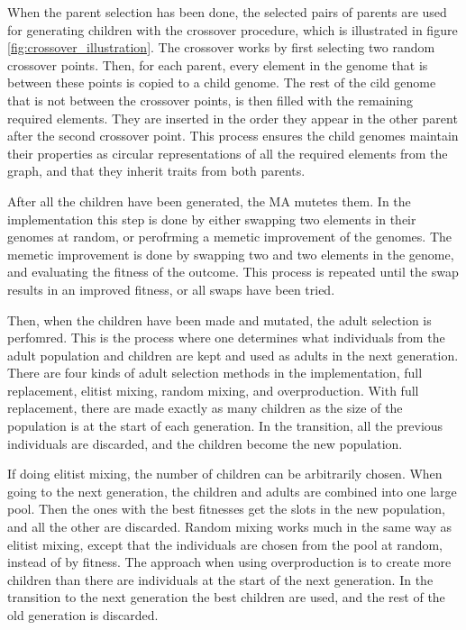 When the parent selection has been done, the selected pairs of parents are used for generating children with the crossover procedure, which is illustrated in figure \ref{fig:crossover_illustration}. The crossover works by first selecting two random crossover points. Then, for each parent, every element in the genome that is between these points is copied to a child genome. The rest of the cild genome that is not between the crossover points, is then filled with the remaining required elements. They are inserted in the order they appear in the other parent after the second crossover point. This process ensures the child genomes maintain their properties as circular representations of all the required elements from the graph, and that they inherit traits from both parents.

After all the children have been generated, the MA mutetes them. In the implementation this step is done by either swapping two elements in their genomes at random, or perofrming a memetic improvement of the genomes. The memetic improvement is done by swapping two and two elements in the genome, and evaluating the fitness of the outcome. This process is repeated until the swap results in an improved fitness, or all swaps have been tried.

Then, when the children have been made and mutated, the adult selection is perfomred. This is the process where one determines what individuals from the adult population and children are kept and used as adults in the next generation. There are four kinds of adult selection methods in the implementation, full replacement, elitist mixing, random mixing, and overproduction. With full replacement, there are made exactly as many children as the size of the population is at the start of each generation. In the transition, all the previous individuals are discarded, and the children become the new population.

If doing elitist mixing, the number of children can be arbitrarily chosen. When going to the next generation, the children and adults are combined into one large pool. Then the ones with the best fitnesses get the slots in the new population, and all the other are discarded. Random mixing works much in the same way as elitist mixing, except that the individuals are chosen from the pool at random, instead of by fitness. The approach when using overproduction is to create more children than there are individuals at the start of the next generation. In the transition to the next generation the best children are used, and the rest of the old generation is discarded.


